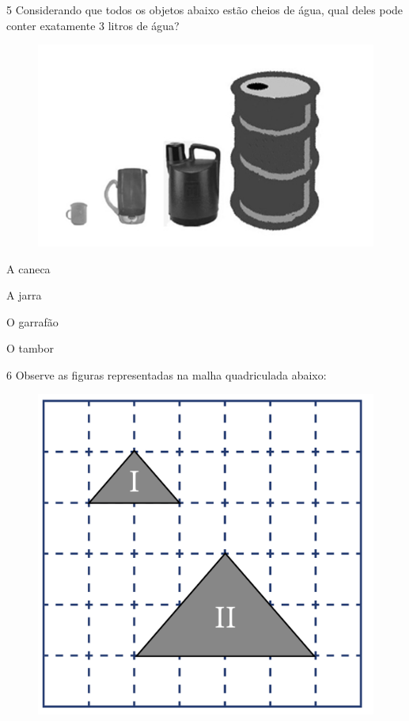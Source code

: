 \num{5} Considerando que todos os objetos abaixo estão cheios de água,
qual deles pode conter exatamente 3 litros de água?

\begin{figure}[htpb!]
\includegraphics[width=.5\textwidth]{./imgs/mat22.png}
\end{figure}


\begin{minipage}{.5\textwidth}
\begin{escolha}
\item
  A caneca
\item
  A jarra
\item
  O garrafão
\item
  O tambor
\end{escolha}
\end{minipage}

\num{6} Observe as figuras representadas na malha quadriculada abaixo:

\begin{figure}[htpb!]
\includegraphics[width=\textwidth]{../ilustracoes/MAT5/SAEB_5ANO_MAT_figura125.png}
\end{figure}

